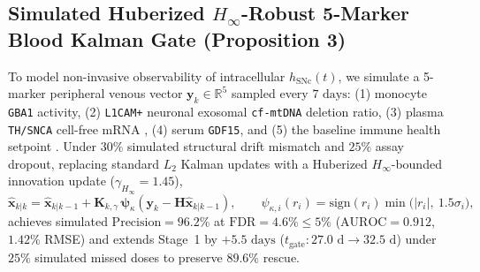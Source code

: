 \documentclass[11pt]{article}
\theoremstyle{plain}
\begin{document}
\subsection{Simulated Huberized $H_\infty$-Robust 5-Marker Blood Kalman Gate (\textbf{Proposition 3})}
To model non-invasive observability of intracellular $h_{\mathrm{SNc}}(t)$, we simulate a 5-marker peripheral venous vector $\mathbf{y}_k \in \mathbb{R}^5$ sampled every $7\text{ days}$: (1) monocyte \texttt{GBA1} activity, (2) \texttt{L1CAM+} neuronal exosomal \texttt{cf-mtDNA} deletion ratio, (3) plasma \texttt{TH/SNCA} cell-free mRNA \cite{toden2020noninvasive}, (4) serum \texttt{GDF15}, and (5) the baseline immune health setpoint \cite{sparks2024human}. Under $30\%$ simulated structural drift mismatch and $25\%$ assay dropout, replacing standard $L_2$ Kalman updates \cite{kalman1960new} with a Huberized \cite{huber1964robust} $H_\infty$-bounded innovation update ($\gamma_{H_\infty} = 1.45$),
\begin{equation}
  \hat{\mathbf{x}}_{k|k} = \hat{\mathbf{x}}_{k|k-1} + \mathbf{K}_{k,\gamma}\,\boldsymbol{\psi}_\kappa\!\left(\mathbf{y}_k - \mathbf{H}\hat{\mathbf{x}}_{k|k-1}\right), \qquad \psi_{\kappa,i}(r_i) = \mathrm{sign}(r_i)\min\!\big(|r_i|,\ 1.5\sigma_i\big),
  \label{eq:huber_kalman}
\end{equation}
achieves simulated $\mathrm{Precision} = 96.2\%$ at $\mathrm{FDR} = 4.6\% \le 5\%$ \cite{dupire2026fifteen} ($\mathrm{AUROC} = 0.912$, $1.42\%$ RMSE) and extends Stage~1 by $+5.5\text{ days}$ ($t_{\mathrm{gate}}: 27.0\text{ d} \to 32.5\text{ d}$) under $25\%$ simulated missed doses to preserve $89.6\%$ rescue.
\end{document}
